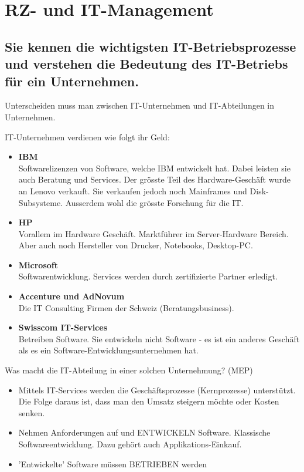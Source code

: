 \chapter{RZ- und IT-Management}

\section{Sie kennen die wichtigsten IT-Betriebsprozesse und	verstehen die Bedeutung des IT-Betriebs für ein	Unternehmen.}

Unterscheiden muss man zwischen IT-Unternehmen und IT-Abteilungen in Unternehmen.

IT-Unternehmen verdienen wie folgt ihr Geld:
\begin{itemize}
	\item \textbf{IBM}\\
	Softwarelizenzen von Software, welche IBM entwickelt hat. Dabei leisten sie auch Beratung und Services. Der grösste Teil
	des Hardware-Geschäft wurde an Lenovo verkauft. Sie verkaufen jedoch noch Mainframes und Disk-Subsysteme. Ausserdem
	wohl die grösste Forschung für die IT.
	\item \textbf{HP}\\
	Vorallem im Hardware Geschäft. Marktführer im Server-Hardware Bereich. Aber auch noch Hersteller von Drucker, Notebooks,
	Desktop-PC.
	\item \textbf{Microsoft}\\
	Softwarentwicklung. Services werden durch zertifizierte Partner erledigt.
	\item \textbf{Accenture und AdNovum}\\
	Die IT Consulting Firmen der Schweiz (Beratungsbusiness).
	\item \textbf{Swisscom IT-Services}\\
	Betreiben Software. Sie entwickeln nicht Software - es ist ein anderes Geschäft als es ein Software-Entwicklungsunternehmen hat.
\end{itemize}

Was macht die IT-Abteilung in einer solchen Unternehmung? (MEP)
\begin{itemize}
	\item Mittels IT-Services werden die Geschäftsprozesse (Kernprozesse) unterstützt. Die Folge daraus ist, dass man den Umsatz steigern möchte oder Kosten senken.
	\item Nehmen Anforderungen auf und ENTWICKELN Software. Klassische Softwareentwicklung. Dazu gehört auch Applikations-Einkauf.
	\item 'Entwickelte' Software müssen BETRIEBEN werden
\end{itemize}

